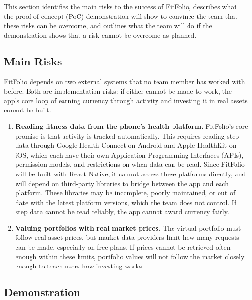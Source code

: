 \documentclass{article}
\begin{document}

This section identifies the main risks to the success of FitFolio, 
describes what the proof of concept (PoC) demonstration will show to convince the team that these risks can be overcome, 
and outlines what the team will do if the demonstration shows that a risk cannot be overcome as planned.

\subsection{Main Risks}

FitFolio depends on two external systems that no team member has worked with before. 
Both are implementation risks: if either cannot be made to work, the app's core loop of earning currency through activity and investing it in real assets cannot be built.

\begin{enumerate}
  \item \textbf{Reading fitness data from the phone's health platform.} FitFolio's core promise is that activity is tracked automatically. 
  This requires reading step data through Google Health Connect on Android and Apple HealthKit on iOS, which each have their own Application Programming Interfaces (APIs), permission models, and restrictions on when data can be read. 
  Since FitFolio will be built with React Native, it cannot access these platforms directly, and will depend on third-party libraries to bridge between the app and each platform. 
  These libraries may be incomplete, poorly maintained, or out of date with the latest platform versions, which the team does not control. If step data cannot be read reliably, the app cannot award currency fairly.
  \item \textbf{Valuing portfolios with real market prices.} The virtual portfolio must follow real asset prices, but market data providers limit how many requests can be made, especially on free plans. 
  If prices cannot be retrieved often enough within these limits, portfolio values will not follow the market closely enough to teach users how investing works.
\end{enumerate}

\subsection{Demonstration}
\end{document}
